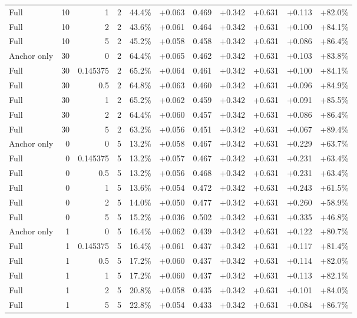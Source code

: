 \begin{table}[htbp]
\begin{tabular}{lrrrccccccc}
Full & 10 & 1 & 2 & 44.4\% & +0.063 & 0.469 & +0.342 & +0.631 & +0.113 & +82.0\% \\
Full & 10 & 2 & 2 & 43.6\% & +0.061 & 0.464 & +0.342 & +0.631 & +0.100 & +84.1\% \\
Full & 10 & 5 & 2 & 45.2\% & +0.058 & 0.458 & +0.342 & +0.631 & +0.086 & +86.4\% \\
Anchor only & 30 & 0 & 2 & 64.4\% & +0.065 & 0.462 & +0.342 & +0.631 & +0.103 & +83.8\% \\
Full & 30 & 0.145375 & 2 & 65.2\% & +0.064 & 0.461 & +0.342 & +0.631 & +0.100 & +84.1\% \\
Full & 30 & 0.5 & 2 & 64.8\% & +0.063 & 0.460 & +0.342 & +0.631 & +0.096 & +84.9\% \\
Full & 30 & 1 & 2 & 65.2\% & +0.062 & 0.459 & +0.342 & +0.631 & +0.091 & +85.5\% \\
Full & 30 & 2 & 2 & 64.4\% & +0.060 & 0.457 & +0.342 & +0.631 & +0.086 & +86.4\% \\
Full & 30 & 5 & 2 & 63.2\% & +0.056 & 0.451 & +0.342 & +0.631 & +0.067 & +89.4\% \\
Anchor only & 0 & 0 & 5 & 13.2\% & +0.058 & 0.467 & +0.342 & +0.631 & +0.229 & +63.7\% \\
Full & 0 & 0.145375 & 5 & 13.2\% & +0.057 & 0.467 & +0.342 & +0.631 & +0.231 & +63.4\% \\
Full & 0 & 0.5 & 5 & 13.2\% & +0.056 & 0.468 & +0.342 & +0.631 & +0.231 & +63.4\% \\
Full & 0 & 1 & 5 & 13.6\% & +0.054 & 0.472 & +0.342 & +0.631 & +0.243 & +61.5\% \\
Full & 0 & 2 & 5 & 14.0\% & +0.050 & 0.477 & +0.342 & +0.631 & +0.260 & +58.9\% \\
Full & 0 & 5 & 5 & 15.2\% & +0.036 & 0.502 & +0.342 & +0.631 & +0.335 & +46.8\% \\
Anchor only & 1 & 0 & 5 & 16.4\% & +0.062 & 0.439 & +0.342 & +0.631 & +0.122 & +80.7\% \\
Full & 1 & 0.145375 & 5 & 16.4\% & +0.061 & 0.437 & +0.342 & +0.631 & +0.117 & +81.4\% \\
Full & 1 & 0.5 & 5 & 17.2\% & +0.060 & 0.437 & +0.342 & +0.631 & +0.114 & +82.0\% \\
Full & 1 & 1 & 5 & 17.2\% & +0.060 & 0.437 & +0.342 & +0.631 & +0.113 & +82.1\% \\
Full & 1 & 2 & 5 & 20.8\% & +0.058 & 0.435 & +0.342 & +0.631 & +0.101 & +84.0\% \\
Full & 1 & 5 & 5 & 22.8\% & +0.054 & 0.433 & +0.342 & +0.631 & +0.084 & +86.7\% \\

\end{tabular}
\end{table}
